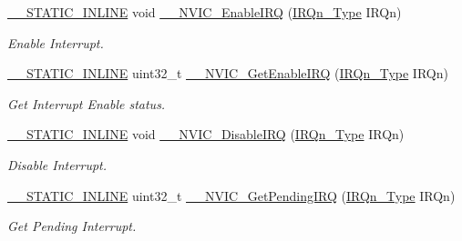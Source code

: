 \begin{DoxyCompactItemize}
\item 
\hyperlink{cmsis__iccarm_8h_aba87361bfad2ae52cfe2f40c1a1dbf9c}{\+\_\+\+\_\+\+S\+T\+A\+T\+I\+C\+\_\+\+I\+N\+L\+I\+NE} void \hyperlink{group___c_m_s_i_s___core___n_v_i_c_functions_ga71227e1376cde11eda03fcb62f1b33ea}{\+\_\+\+\_\+\+N\+V\+I\+C\+\_\+\+Enable\+I\+RQ} (\hyperlink{group___peripheral__interrupt__number__definition_ga7e1129cd8a196f4284d41db3e82ad5c8}{I\+R\+Qn\+\_\+\+Type} I\+R\+Qn)
\begin{DoxyCompactList}\small\item\em Enable Interrupt. \end{DoxyCompactList}\item 
\hyperlink{cmsis__iccarm_8h_aba87361bfad2ae52cfe2f40c1a1dbf9c}{\+\_\+\+\_\+\+S\+T\+A\+T\+I\+C\+\_\+\+I\+N\+L\+I\+NE} uint32\+\_\+t \hyperlink{group___c_m_s_i_s___core___n_v_i_c_functions_gaaeb5e7cc0eaad4e2817272e7bf742083}{\+\_\+\+\_\+\+N\+V\+I\+C\+\_\+\+Get\+Enable\+I\+RQ} (\hyperlink{group___peripheral__interrupt__number__definition_ga7e1129cd8a196f4284d41db3e82ad5c8}{I\+R\+Qn\+\_\+\+Type} I\+R\+Qn)
\begin{DoxyCompactList}\small\item\em Get Interrupt Enable status. \end{DoxyCompactList}\item 
\hyperlink{cmsis__iccarm_8h_aba87361bfad2ae52cfe2f40c1a1dbf9c}{\+\_\+\+\_\+\+S\+T\+A\+T\+I\+C\+\_\+\+I\+N\+L\+I\+NE} void \hyperlink{group___c_m_s_i_s___core___n_v_i_c_functions_gae016e4c1986312044ee768806537d52f}{\+\_\+\+\_\+\+N\+V\+I\+C\+\_\+\+Disable\+I\+RQ} (\hyperlink{group___peripheral__interrupt__number__definition_ga7e1129cd8a196f4284d41db3e82ad5c8}{I\+R\+Qn\+\_\+\+Type} I\+R\+Qn)
\begin{DoxyCompactList}\small\item\em Disable Interrupt. \end{DoxyCompactList}\item 
\hyperlink{cmsis__iccarm_8h_aba87361bfad2ae52cfe2f40c1a1dbf9c}{\+\_\+\+\_\+\+S\+T\+A\+T\+I\+C\+\_\+\+I\+N\+L\+I\+NE} uint32\+\_\+t \hyperlink{group___c_m_s_i_s___core___n_v_i_c_functions_ga5a92ca5fa801ad7adb92be7257ab9694}{\+\_\+\+\_\+\+N\+V\+I\+C\+\_\+\+Get\+Pending\+I\+RQ} (\hyperlink{group___peripheral__interrupt__number__definition_ga7e1129cd8a196f4284d41db3e82ad5c8}{I\+R\+Qn\+\_\+\+Type} I\+R\+Qn)
\begin{DoxyCompactList}\small\item\em Get Pending Interrupt. \end{DoxyCompactList}\item 

\end{DoxyCompactItemize}
